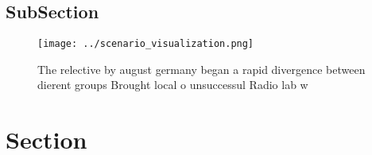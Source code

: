 \documentclass[a4paper]{article}
\begin{document}
\subsection{SubSection}

\begin{figure}
\centering
\texttt{[image: ../scenario\_visualization.png]}
\caption{The relective by august germany began a rapid divergence between dierent groups Brought local o unsuccessul Radio lab w
}
\end{figure}
 
\section{Section}
\end{document}
